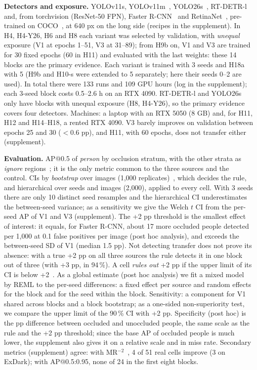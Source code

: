 \documentclass[conference]{IEEEtran}
\begin{document}
\textbf{Detectors and exposure.} YOLOv11s, YOLOv11m~\cite{Ultralytics2024}, YOLO26s~\cite{Ultralytics2026yolo26}, RT-DETR-l~\cite{Zhao2024rtdetr} and, from torchvision (ResNet-50 FPN), Faster R-CNN~\cite{Ren2017faster} and RetinaNet~\cite{Lin2017focal}, pre-trained on COCO~\cite{Lin2014}, at 640 px on the long side (recipes in the supplement). In H4, H4-Y26, H6 and H8 each variant was selected by validation, with \emph{unequal} exposure (V1 at epochs 1--51, V3 at 31--89); from H9b on, V1 and V3 are trained for 30 fixed epochs (60 in H11) and evaluated with the last weights: these 14 blocks are the primary evidence. Each variant is trained with 3 seeds and H18a with 5 (H9b and H10-s were extended to 5 separately; here their seeds 0--2 are used). In total there were 133 runs and 109 GPU hours (log in the supplement); each 3-seed block costs 0.5--2.6 h on an RTX 4090. RT-DETR-l and YOLO26s only have blocks with unequal exposure (H8, H4-Y26), so the primary evidence covers four detectors. Machines: a laptop with an RTX 5050 (8 GB) and, for H11, H12 and H14--H18, a rented RTX 4090. V3 barely improves on validation between epochs 25 and 30 ($<$0.6 pp), and H11, with 60 epochs, does not transfer either (supplement).

\textbf{Evaluation.} AP@0.5 of \emph{person} by occlusion stratum, with the other strata as \emph{ignore} regions~\cite{Zhang2017}; it is the only metric common to the three sources and the control. CIs by \emph{bootstrap} over images (1,000 replicates)~\cite{Efron1993}, which decides the rule, and hierarchical over seeds and images (2,000), applied to every cell. With 3 seeds there are only 10 distinct seed resamples and the hierarchical CI underestimates the between-seed variance; as a sensitivity we give the Welch $t$ CI from the per-seed AP of V1 and V3 (supplement). The +2 pp threshold is the smallest effect of interest: it equals, for Faster R-CNN, about 17 more occluded people detected per 1,000 at 0.1 false positives per image (post hoc analysis), and exceeds the between-seed SD of V1 (median 1.5 pp). Not detecting transfer does not prove its absence: with a true +2 pp on all three sources the rule detects it in one block out of three (with +3 pp, in 94\,\%). A cell \emph{rules out} +2 pp if the upper limit of its CI is below +2~\cite{Lakens2017tost}. As a global estimate (post hoc analysis) we fit a mixed model by REML to the per-seed differences: a fixed effect per source and random effects for the block and for the seed within the block. Sensitivity: a component for V1 shared across blocks and a block bootstrap; as a one-sided non-superiority test, we compare the upper limit of the 90\,\% CI with +2 pp. Specificity (post hoc) is the pp difference between occluded and unoccluded people, the same scale as the rule and the +2 pp threshold; since the base AP of occluded people is much lower, the supplement also gives it on a relative scale and in miss rate. Secondary metrics (supplement) agree: with MR$^{-2}$~\cite{Dollar2012}, 4 of 51 real cells improve (3 on ExDark); with AP@0.5:0.95, none of 24 in the first eight blocks.
\end{document}
